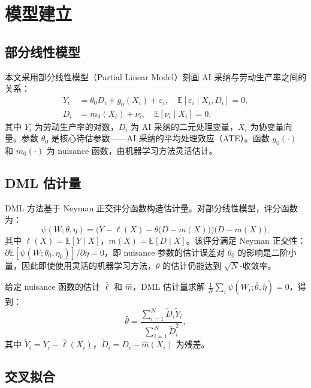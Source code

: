 \documentclass[UTF8,11pt,a4paper]{ctexart}
\begin{document}
\section{模型建立}\label{sec:model}

\subsection{部分线性模型}

本文采用部分线性模型（Partial Linear Model）刻画 AI 采纳与劳动生产率之间的关系：
\begin{align}
Y_i &= \theta_0 D_i + g_0(X_i) + \varepsilon_i, \quad \mathbb{E}[\varepsilon_i \mid X_i, D_i] = 0, \label{eq:plm_y} \\
D_i &= m_0(X_i) + \nu_i, \quad \mathbb{E}[\nu_i \mid X_i] = 0. \label{eq:plm_d}
\end{align}
其中 $Y_i$ 为劳动生产率的对数，$D_i$ 为 AI 采纳的二元处理变量，$X_i$ 为协变量向量。参数 $\theta_0$ 是核心待估参数——AI 采纳的平均处理效应（ATE）。函数 $g_0(\cdot)$ 和 $m_0(\cdot)$ 为 nuisance 函数，由机器学习方法灵活估计。

\subsection{DML 估计量}

DML 方法基于 Neyman 正交评分函数构造估计量。对部分线性模型，评分函数为：
\begin{equation}\label{eq:score}
\psi(W; \theta, \eta) = \bigl(Y - \ell(X) - \theta \bigl(D - m(X)\bigr)\bigr) \bigl(D - m(X)\bigr),
\end{equation}
其中 $\ell(X) = \mathbb{E}[Y \mid X]$，$m(X) = \mathbb{E}[D \mid X]$。该评分满足 Neyman 正交性：$\partial \mathbb{E}[\psi(W; \theta_0, \eta_0)] / \partial \eta = 0$，即 nuisance 参数的估计误差对 $\theta_0$ 的影响是二阶小量，因此即使使用灵活的机器学习方法，$\theta$ 的估计仍能达到 $\sqrt{N}$-收敛率。

给定 nuisance 函数的估计 $\hat\ell$ 和 $\hat m$，DML 估计量求解 $\frac{1}{N}\sum_i \psi(W_i; \hat\theta, \hat\eta) = 0$，得到：
\begin{equation}\label{eq:dml_estimator}
\hat\theta = \frac{\sum_{i=1}^N \tilde D_i \tilde Y_i}{\sum_{i=1}^N \tilde D_i^2},
\end{equation}
其中 $\tilde Y_i = Y_i - \hat\ell(X_i)$，$\tilde D_i = D_i - \hat m(X_i)$ 为残差。

\subsection{交叉拟合}
\end{document}
